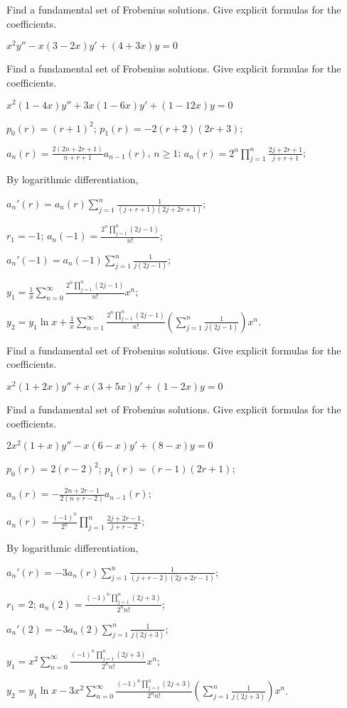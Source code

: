 \documentclass{ximera}
\begin{document}
\begin{problem}\label{exer:7.6.19}
Find a fundamental set of Frobenius  solutions.
Give explicit formulas for the coefficients.

$x^2y''-x(3-2x)y'+(4+3x)y=0$
\end{problem}

\begin{problem}\label{exer:7.6.20}
Find a fundamental set of Frobenius  solutions.
Give explicit formulas for the coefficients. 

$x^2(1-4x)y''+3x(1-6x)y'+(1-12x)y=0$

\begin{solution}
    $p_0(r)=(r+1)^2$;
$p_1(r)=-2(r+2)(2r+3)$;

$a_n(r)=\frac{2(2n+2r+1)}{ n+r+1}
a_{n-1}(r)$, $n\geq 1$;
 $a_n(r)=2^n\prod_{j=1}^n\frac{2j+2r+1}{ j+r+1}$;

By logarithmic differentiation,

$a_n'(r)=a_n(r)\sum_{j=1}^n\frac{1}{(j+r+1)(2j+2r+1)}$;

$r_1=-1$;
$a_n(-1)=\frac{2^n\prod_{j=1}^n(2j-1)}{ n!}$;

$a_n'(-1)=a_n(-1)\sum_{j=1}^n\frac{1}{ j(2j-1)}$;

$y_1=\frac{1}{ x}\sum_{n=0}^\infty \frac{2^n\prod_{j=1}^n(2j-1)}{ n!}
x^n$;

$y_2=y_1\ln
x+\frac{1}{ x}\sum_{n=1}^\infty\frac{2^n\prod_{j=1}^n(2j-1)}{ n!}
\left(\sum_{j=1}^n\frac{1}{ j(2j-1)}\right)x^n$.
\end{solution}
\end{problem}

\begin{problem}\label{exer:7.6.21}
Find a fundamental set of Frobenius  solutions.
Give explicit formulas for the coefficients.

$x^2(1+2x)y''+x(3+5x)y'+(1-2x)y=0$
\end{problem}

\begin{problem}\label{exer:7.6.22}
Find a fundamental set of Frobenius  solutions.
Give explicit formulas for the coefficients.

$2x^2(1+x)y''-x(6-x)y'+(8-x)y=0$

\begin{solution}
    $p_0(r)=2(r-2)^2$;
$p_1(r)=(r-1)(2r+1)$;

$a_n(r)=-\frac{2n+2r-1}{2(n+r-2)}a_{n-1}(r)$;

 $a_n(r)=\frac{(-1)^n}{ 2^n}\prod_{j=1}^n\frac{2j+2r-1}{ j+r-2}$;

By logarithmic differentiation,

$a_n'(r)=-3a_n(r)\sum_{j=1}^n\frac{1}{(j+r-2)(2j+2r-1)}$;

$r_1=2$;
$a_n(2)=\frac{(-1)^n\prod_{j=1}^n(2j+3)}{2^nn!}$;

$a_n'(2)=-3a_n(2)\sum_{j=1}^n\frac{1}{ j(2j+ 3)}$;

$y_1=x^2\sum_{n=0}^\infty
\frac{(-1)^n\prod_{j=1}^n(2j+3)}{2^nn!}x^n$;

$y_2=y_1\ln x-3x^2\sum_{n=0}^\infty
\frac{(-1)^n\prod_{j=1}^n(2j+3)}{2^nn!}
\left(\sum_{j=1}^n\frac{1}{ j(2j+ 3)}\right)x^n$.
\end{solution}
\end{problem}
\end{document}
